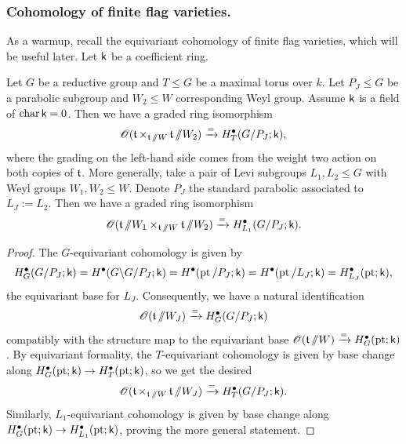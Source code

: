 \subsubsection{Cohomology of finite flag varieties.}
As a warmup, recall the equivariant cohomology of finite flag varieties, which will be useful later. Let $\mathsf{k}$ be a coefficient ring.
\begin{lemma}\label{lemma: equivariant cohomology of finite flag varieties}
Let $G$ be a reductive group and $T \leq G$ be a maximal torus over $k$. Let $P_J \leq G$ be a parabolic subgroup and $W_2 \leq W$ corresponding Weyl group. Assume $\mathsf{k}$ is a field of $\operatorname{char} \mathsf{k} = 0$. Then we have a graded ring isomorphism
\begin{equation*}
    \operatorname{\mathscr{O}}(\operatorname{\mathfrak{t}} \times_{\operatorname{\mathfrak{t}} \sslash W} \operatorname{\mathfrak{t}} \sslash W_2) \xrightarrow{=} H^{\bullet}_{T}(G/P_J; \mathsf{k}),
\end{equation*}
where the grading on the left-hand side comes from the weight two action on both copies of $\operatorname{\mathfrak{t}}$.
More generally, take a pair of Levi subgroups $L_1, L_2 \leq G$ with Weyl groups $W_1, W_2 \leq W$. Denote $P_J$ the standard parabolic associated to $L_J := L_2$. Then we have a graded ring isomorphism
\begin{equation*}
    \operatorname{\mathscr{O}}(\operatorname{\mathfrak{t}} \sslash W_1 \times_{\operatorname{\mathfrak{t}} \sslash W} \operatorname{\mathfrak{t}} \sslash W_2) \xrightarrow{=} H^{\bullet}_{L_1}(G/P_J; \mathsf{k}).
\end{equation*}
\end{lemma}
\begin{proof}
The $G$-equivariant cohomology is given by 
\begin{equation*}
 H^{\bullet}_G(G/P_J; \mathsf{k}) = H^{\bullet}(G \backslash G / P_J; \mathsf{k}) = H^{\bullet}(\operatorname{pt} / P_J; \mathsf{k}) = H^{\bullet}(\operatorname{pt} / L_J; \mathsf{k}) = H^{\bullet}_{L_J}(\operatorname{pt}; \mathsf{k}),   
\end{equation*}
the equivariant base for $L_J$. Consequently, we have a natural identification
\begin{equation*}
 \operatorname{\mathscr{O}}(\operatorname{\mathfrak{t}} \sslash W_J) \xrightarrow{=} H^{\bullet}_G(G/P_J; \mathsf{k})   
\end{equation*}
compatibly with the structure map to the equivariant base $\operatorname{\mathscr{O}}(\operatorname{\mathfrak{t}} \sslash W) \xrightarrow{=} H^{\bullet}_G(\operatorname{pt}; \mathsf{k})$. By equivariant formality, the $T$-equivariant cohomology is given by base change along $H^{\bullet}_G(\operatorname{pt}; \mathsf{k}) \to H^{\bullet}_T(\operatorname{pt}; \mathsf{k})$, so we get the desired
\begin{equation*}
\operatorname{\mathscr{O}}(\operatorname{\mathfrak{t}} \times_{\operatorname{\mathfrak{t}} \sslash W} \operatorname{\mathfrak{t}} \sslash W_J) \xrightarrow{=} H^{\bullet}_{T}(G/P_J; \mathsf{k}).    
\end{equation*}
Similarly, $L_1$-equivariant cohomology is given by base change along $H^{\bullet}_G(\operatorname{pt}; \mathsf{k}) \to H^{\bullet}_{L_1}(\operatorname{pt}; \mathsf{k})$, proving the more general statement.
\end{proof}



